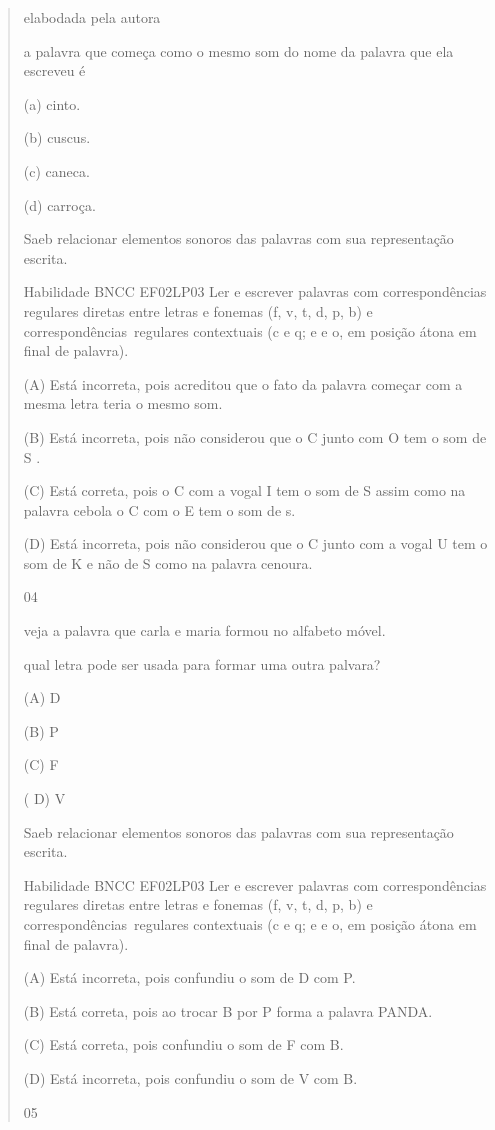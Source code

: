 \begin{verse}
{{{{{{{{{{{{{{{{{{{{elabodada pela autora

a palavra que começa como o mesmo som do nome da palavra que ela
escreveu é

(a) cinto.

(b) cuscus.

(c) caneca.

(d) carroça.

Saeb relacionar elementos sonoros das palavras com sua representação
escrita.

Habilidade BNCC EF02LP03 Ler e escrever palavras com correspondências
regulares diretas entre letras e fonemas (f, v, t, d, p, b) e
correspondências~regulares contextuais (c e q; e e o, em posição átona
em final de palavra).

(A) Está incorreta, pois acreditou que o fato da palavra começar com a
mesma letra teria o mesmo som.

(B) Está incorreta, pois não considerou que o C junto com O tem o som de
S .

(C) Está correta, pois o C com a vogal I tem o som de S assim como na
palavra cebola o C com o E tem o som de s.

(D) Está incorreta, pois não considerou que o C junto com a vogal U tem
o som de K e não de S como na palavra cenoura.

\num{04}

veja a palavra que carla e maria formou no alfabeto móvel.

qual letra pode ser usada para formar uma outra palvara?

(A) D

(B) P

(C) F

( D) V

Saeb relacionar elementos sonoros das palavras com sua representação
escrita.

Habilidade BNCC EF02LP03 Ler e escrever palavras com correspondências
regulares diretas entre letras e fonemas (f, v, t, d, p, b) e
correspondências~regulares contextuais (c e q; e e o, em posição átona
em final de palavra).

(A) Está incorreta, pois confundiu o som de D com P.

(B) Está correta, pois ao trocar B por P forma a palavra PANDA.

(C) Está correta, pois confundiu o som de F com B.

(D) Está incorreta, pois confundiu o som de V com B.

\num{05}

}}}}}}}}}}}}}}}}}}}}
\end{verse}
